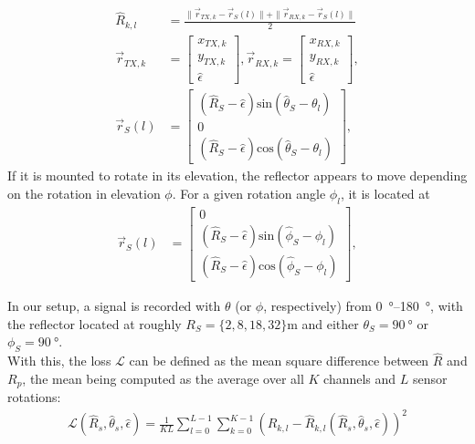 \begin{align}
    \hat R_{k,l}   & = \frac{\| \vec r_{TX,k} - \vec r_S(l) \|+\| \vec r_{RX,k} - \vec r_S(l) \|}{2}
    \\
    \vec{r}_{TX,k} & = \begin{bmatrix}
                           x_{TX,k} \\ y_{TX,k} \\ \hat \epsilon
                       \end{bmatrix},
    \vec r_{RX,k}       = \begin{bmatrix}
                              x_{RX,k} \\ y_{RX,k} \\ \hat \epsilon
                          \end{bmatrix},                                                                                        \\
    \vec r_S(l)    & = \begin{bmatrix}
                           (\hat R_S-\hat \epsilon) \text{sin}(\hat \theta_S-\theta_l) \\ 0 \\ (\hat R_S-\hat \epsilon) \text{cos}(\hat \theta_S-\theta_l)
                       \end{bmatrix},
\end{align}
If it is mounted to rotate in its elevation, the reflector appears to move depending on the rotation in elevation $\phi$.
For a given rotation angle $\phi_l$, it is located at
\begin{align}
    \vec r_S(l) & = \begin{bmatrix}
                        0 \\ (\hat R_S-\hat \epsilon) \text{sin}(\hat \phi_S-\phi_l) \\ (\hat R_S-\hat \epsilon) \text{cos}(\hat \phi_S-\phi_l)
                    \end{bmatrix},
\end{align}

In our setup, a signal is recorded with $\theta$ (or $\phi$, respectively) from \SIrange{0}{180}{\degree},
with the reflector located at roughly $R_S = \{2,8,18,32\}\si{\meter}$ and either $\theta_S = \SI{90}{\degree}$ or $\phi_S = \SI{90}{\degree}$. \\

With this, the loss $\mathcal L$ can be defined as the mean square difference between $\hat R$ and $R_{p}$,
the mean being computed as the average over all $K$ channels and $L$ sensor rotations:
\begin{align}
    \mathcal L(\hat R_s, \hat \theta_s, \hat \epsilon)
    = \frac{1}{KL}\sum_{l=0}^{L-1} \sum_{k=0}^{K-1} ( R_{k,l} - \hat  R_{k,l}(\hat R_s, \hat \theta_s, \hat \epsilon))^2
\end{align} \\

